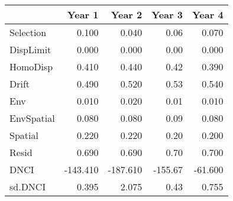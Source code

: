 \begin{longtable}{l|rrrr}
\toprule
\multicolumn{1}{l}{} & Year 1 & Year 2 & Year 3 & Year 4 \\ 
\midrule
Selection & 0.100 & 0.040 & 0.06 & 0.070 \\ 
DispLimit & 0.000 & 0.000 & 0.00 & 0.000 \\ 
HomoDisp & 0.410 & 0.440 & 0.42 & 0.390 \\ 
Drift & 0.490 & 0.520 & 0.53 & 0.540 \\ 
Env & 0.010 & 0.020 & 0.01 & 0.010 \\ 
EnvSpatial & 0.080 & 0.080 & 0.09 & 0.080 \\ 
Spatial & 0.220 & 0.220 & 0.20 & 0.200 \\ 
Resid & 0.690 & 0.690 & 0.70 & 0.700 \\ 
DNCI & -143.410 & -187.610 & -155.67 & -61.600 \\ 
sd.DNCI & 0.395 & 2.075 & 0.43 & 0.755 \\ 
\bottomrule
\end{longtable}

